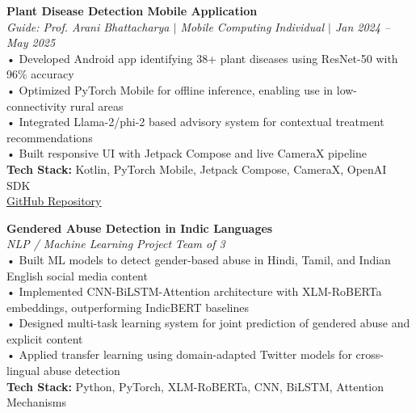 \documentclass[10pt]{extarticle}
\begin{document}
\vspace{8pt}

\begin{contained}
\vspace{5pt}

\textbf{Plant Disease Detection Mobile Application}\\
\textit{Guide: Prof. Arani Bhattacharya $|$ Mobile Computing}
\hfill \textit{Individual $|$ Jan 2024 -- May 2025}\\
\vspace{3pt}
• Developed Android app identifying 38+ plant diseases using ResNet-50 with 96\% accuracy\\
• Optimized PyTorch Mobile for offline inference, enabling use in low-connectivity rural areas\\
• Integrated Llama-2/phi-2 based advisory system for contextual treatment recommendations\\
• Built responsive UI with Jetpack Compose and live CameraX pipeline\\
\textbf{Tech Stack:} Kotlin, PyTorch Mobile, Jetpack Compose, CameraX, OpenAI SDK\\
\href{https://github.com/Himanshu8368/MC_project}{GitHub Repository}

\vspace{10pt}

\textbf{Gendered Abuse Detection in Indic Languages}\\
\textit{NLP / Machine Learning Project}
\hfill \textit{Team of 3}\\
\vspace{3pt}
• Built ML models to detect gender-based abuse in Hindi, Tamil, and Indian English social media content\\
• Implemented CNN-BiLSTM-Attention architecture with XLM-RoBERTa embeddings, outperforming IndicBERT baselines\\
• Designed multi-task learning system for joint prediction of gendered abuse and explicit content\\
• Applied transfer learning using domain-adapted Twitter models for cross-lingual abuse detection\\
\textbf{Tech Stack:} Python, PyTorch, XLM-RoBERTa, CNN, BiLSTM, Attention Mechanisms

\vspace{10pt}


\end{contained}
\end{document}
